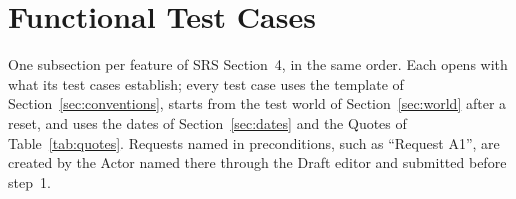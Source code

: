 \section{Functional Test Cases}\label{sec:cases}
One subsection per feature of SRS Section~4, in the same order. Each opens with what its test cases establish; every test case uses the template of Section~\ref{sec:conventions}, starts from the test world of Section~\ref{sec:world} after a reset, and uses the dates of Section~\ref{sec:dates} and the Quotes of Table~\ref{tab:quotes}. Requests named in preconditions, such as ``Request A1'', are created by the Actor named there through the Draft editor and submitted before step~1.













